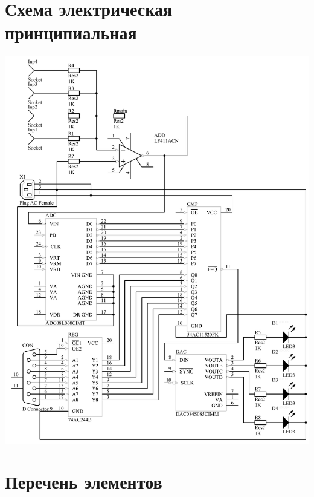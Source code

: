 	\section{Схема электрическая принципиальная}
		\begin{center}
			\includegraphics[width=155mm]{src/pictures/schemep3.png}
		\end{center}
	\section{Перечень элементов}
		

